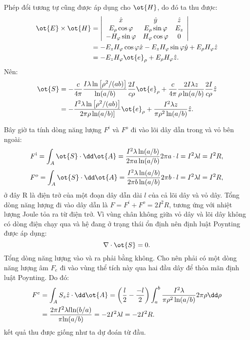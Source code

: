 \begin{loigiai}
\begin{enumerate}[1)]
Phép đổi tương tự cũng được áp dụng cho $\ot{H}$, do đó ta thu được:
\begin{align*}
    {\ot { E }} \times \ot{H} &= \left|\begin{array}{ccc}
\hat{{x}} & \hat{{y}} & \hat{{z}} \\
E_{\rho} \cos \varphi & E_{\rho} \sin \varphi & E_{z} \\
-H_{\varphi} \sin \varphi & H_{\varphi} \cos \varphi & 0
\end{array}\right|\\
    &= -E_{z} H_{\varphi} \cos \varphi \hat{{x}}-E_{z} H_{\varphi} \sin \varphi \hat{{y}}+E_{\rho} H_{\varphi} \hat{{z}}\\
    &= -E_{z} H_{\varphi} \ot{e}_{\rho}+E_{\rho} H_{\varphi} \hat{{z}}.
\end{align*}
Nên:
\begin{align*}
    \ot{S} &= -\frac{c}{4 \pi} \frac{I \lambda \ln \left[\rho^{2} /(a b)\right]}{\ln (a / b)} \frac{2 I}{c \rho} \ot{e}_{\rho}+\frac{c}{4 \pi} \frac{2 I \lambda z}{\rho \ln (a / b)} \frac{2 I}{c \rho} \hat{{z}}\\
    &= -\frac{I^{2} \lambda \ln \left[\rho^{2} /(a b)\right]}{2 \pi \rho \ln (a / b)]} \ot{e}_{\rho}+\frac{I^{2} \lambda z}{\pi \rho^{2} \ln (a / b)} \hat{{z}}.
\end{align*}

Bây giờ ta tính dòng năng lượng $F^i$ và $F^o$ đi vào lõi dây dẫn trong và vỏ bên ngoài:
    $$F^{\mathrm{i}}=\int_{A} \ot{S} \cdot \dd \ot{A}=\frac{I^{2} \lambda \ln (a / b)}{2 \pi a \ln (a / b)} 2 \pi a \cdot l=I^{2} \lambda l=I^{2} R,$$
    $$F^{o}=\int_{A} \ot{S} \cdot \dd \ot{A}=\frac{I^{2} \lambda \ln (a / b)}{2 \pi b \ln (a / b)} 2 \pi b \cdot l=I^{2} \lambda l=I^{2} R ,$$
ở đây R là điện trở của một đoạn dây dẫn dài $l$ của cả lõi dây và vỏ dây. Tổng dòng năng lượng đi vào dây dẫn là $F=F^i + F^o = 2I^2 R$, tương ứng với nhiệt lượng Joule tỏa ra từ điện trở. Vì vùng chân không giữa vỏ dây và lõi dây không có dòng điện chạy qua và hệ đang ở trạng thái ổn định nên định luật Poynting được áp dụng:
      $$\nabla \cdot \ot{S} = 0. $$
Tổng dòng năng lượng vào và ra phải bằng không. Cho nên phải có một dòng năng lượng âm $F_e$ đi vào vùng thể tích này qua hai đầu dây để thỏa mãn định luật Poynting. Do đó:
    \begin{align*}
        F^e &= \int_{A} S_z {\hat{z}} \cdot \dd \ot{A} = \left(\frac{l}{2} - \frac{-l}{2}\right) \int_{a}^{b} \frac{I^2 \lambda}{\pi\rho^2 \ln (a/b)} 2 \pi\rho \dd \rho\\
        &= \frac{2\pi I^2 \lambda l \text{ln}(b/a)}{\pi \text{ln}(a/b)} = -2I^2 \lambda l = -2I^2 R.
    \end{align*}
kết quả thu được giống như ta dự đoán từ đầu.
\end{enumerate}
\end{loigiai}


